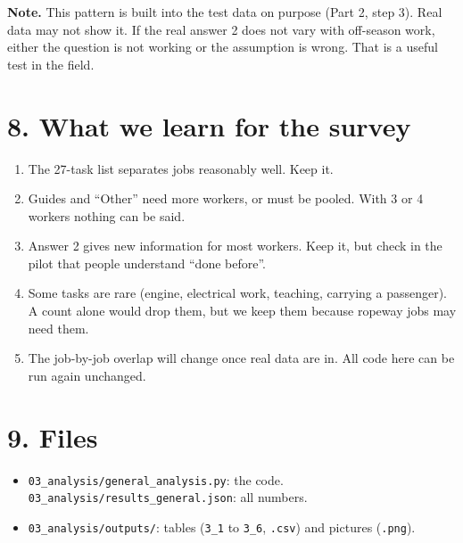 \documentclass[11pt]{article}
\begin{document}
\textbf{Note.} This pattern is built into the test data on purpose (Part 2, step 3). Real data may not show it. If the real answer 2 does not vary with off-season work,
either the question is not working or the assumption is wrong. That is a useful test in the field.

\section*{8. What we learn for the survey}
\begin{enumerate}[leftmargin=1.4em,itemsep=2pt]
\item The 27-task list separates jobs reasonably well. Keep it.
\item Guides and ``Other'' need more workers, or must be pooled. With 3 or 4 workers nothing can be said.
\item Answer 2 gives new information for most workers. Keep it, but check in the pilot that people understand ``done before''.
\item Some tasks are rare (engine, electrical work, teaching, carrying a passenger). A count alone would drop them, but we keep them because ropeway jobs may need them.
\item The job-by-job overlap will change once real data are in. All code here can be run again unchanged.
\end{enumerate}

\section*{9. Files}
\begin{itemize}[leftmargin=1.2em,itemsep=1pt]
\item \texttt{03\_analysis/general\_analysis.py}: the code. \texttt{03\_analysis/results\_general.json}: all numbers.
\item \texttt{03\_analysis/outputs/}: tables (\texttt{3\_1} to \texttt{3\_6}, \texttt{.csv}) and pictures (\texttt{.png}).
\end{itemize}
\end{document}
